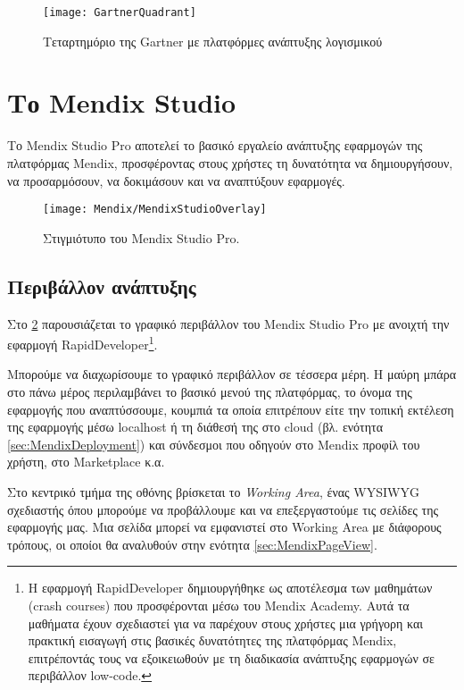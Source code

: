             \begin{figure}[h!] \noindent \centering
                    \texttt{[image: GartnerQuadrant]}
                    \caption{\centering Τεταρτημόριο της Gartner με πλατφόρμες ανάπτυξης λογισμικού \cite{mendixGartnerQuadrant}}
                    \label{fig:GartnerQuadrant}
            \end{figure}

    \section{Το Mendix Studio}
        Το Mendix Studio Pro αποτελεί το βασικό εργαλείο ανάπτυξης εφαρμογών της πλατφόρμας Mendix, προσφέροντας στους χρήστες τη δυνατότητα να δημιουργήσουν, να προσαρμόσουν, να δοκιμάσουν και να αναπτύξουν εφαρμογές.

        \begin{figure}[h!] \noindent \centering
                \texttt{[image: Mendix/MendixStudioOverlay]}
                \caption{\centering Στιγμιότυπο του Mendix Studio Pro.}
                \label{fig:MendixStudioOverlay}
        \end{figure}

        \subsection{Περιβάλλον ανάπτυξης}
        Στο \ref{fig:MendixStudioOverlay} παρουσιάζεται το γραφικό περιβάλλον του Mendix Studio Pro με ανοιχτή την εφαρμογή RapidDeveloper\footnote{Η εφαρμογή RapidDeveloper δημιουργήθηκε ως αποτέλεσμα των μαθημάτων (crash courses) που προσφέρονται μέσω του Mendix Academy. Αυτά τα μαθήματα έχουν σχεδιαστεί για να παρέχουν στους χρήστες μια γρήγορη και πρακτική εισαγωγή στις βασικές δυνατότητες της πλατφόρμας Mendix, επιτρέποντάς τους να εξοικειωθούν με τη διαδικασία ανάπτυξης εφαρμογών σε περιβάλλον low-code.}.

        Μπορούμε να διαχωρίσουμε το γραφικό περιβάλλον σε τέσσερα μέρη. Η μαύρη μπάρα στο πάνω μέρος περιλαμβάνει το βασικό μενού της πλατφόρμας, το όνομα της εφαρμογής που αναπτύσσουμε, κουμπιά τα οποία επιτρέπουν είτε την τοπική εκτέλεση της εφαρμογής μέσω localhost ή τη διάθεσή της στο cloud (βλ. ενότητα \ref{sec:MendixDeployment}) και σύνδεσμοι που οδηγούν στο Mendix προφίλ του χρήστη, στο Marketplace κ.α.

        Στο κεντρικό τμήμα της οθόνης βρίσκεται το \textit{Working Area}, ένας WYSIWYG σχεδιαστής όπου μπορούμε να προβάλλουμε και να επεξεργαστούμε τις σελίδες της εφαρμογής μας. Μια σελίδα μπορεί να εμφανιστεί στο Working Area με διάφορους τρόπους, οι οποίοι θα αναλυθούν στην ενότητα \ref{sec:MendixPageView}.


